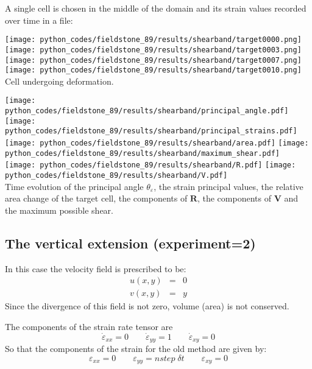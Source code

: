 A single cell is chosen in the middle of the domain and its strain values 
recorded over time in a file:
\begin{center}
\texttt{[image: python\_codes/fieldstone\_89/results/shearband/target0000.png]}
\texttt{[image: python\_codes/fieldstone\_89/results/shearband/target0003.png]}
\texttt{[image: python\_codes/fieldstone\_89/results/shearband/target0007.png]}
\texttt{[image: python\_codes/fieldstone\_89/results/shearband/target0010.png]}\\
{\captionfont Cell undergoing deformation.}
\end{center}

\begin{center}
\texttt{[image: python\_codes/fieldstone\_89/results/shearband/principal\_angle.pdf]}
\texttt{[image: python\_codes/fieldstone\_89/results/shearband/principal\_strains.pdf]}\\
\texttt{[image: python\_codes/fieldstone\_89/results/shearband/area.pdf]}
\texttt{[image: python\_codes/fieldstone\_89/results/shearband/maximum\_shear.pdf]}\\
\texttt{[image: python\_codes/fieldstone\_89/results/shearband/R.pdf]}
\texttt{[image: python\_codes/fieldstone\_89/results/shearband/V.pdf]}\\
{\captionfont Time evolution of the principal angle $\theta_\varepsilon$, 
the strain principal values, the relative area change of the target cell, 
the components of ${\bm R}$, the components of ${\bm V}$ and the maximum 
possible shear.}
\end{center}










\newpage
\subsection*{The vertical extension (experiment=2)} 

In this case the velocity field is prescribed to be:
\begin{eqnarray}
u(x,y)&=&0 \\
v(x,y)&=&y
\end{eqnarray}
Since the divergence of this field is not zero, volume (area) is not conserved.

The components of the strain rate tensor are
\[
\dot\varepsilon_{xx} = 0 
\qquad
\dot\varepsilon_{yy} = 1
\qquad
\dot\varepsilon_{xy} = 0 
\]
So that the components of the strain for the old method are given by:
\[
\varepsilon_{xx} = 0 
\qquad
\varepsilon_{yy} = nstep \; \delta t
\qquad
\varepsilon_{xy} = 0 
\]



